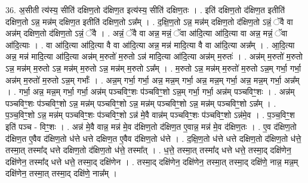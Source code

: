 \documentclass[17pt]{extarticle}
\begin{document}
36. अ॒सीती त्य॑स्य॒ सीति॑ दक्षिण॒तो द॑क्षिण॒त इत्य॑स्य॒ सीति॑ दक्षिण॒तः । . इति॑ दक्षिण॒तो द॑क्षिण॒त इतीति॑ दक्षिण॒तो ऽन्न॒ मन्न॑म् दक्षिण॒त इतीति॑ दक्षिण॒तो ऽन्न᳚म् । . द॒क्षि॒ण॒तो ऽन्न॒ मन्न॑म् दक्षिण॒तो द॑क्षिण॒तो ऽन्नं॒ ॅवै वा अन्न॑म् दक्षिण॒तो द॑क्षिण॒तो ऽन्नं॒ ॅवै । . अन्नं॒ ॅवै वा अन्न॒ मन्नं॒ ॅवा आ॑दि॒त्या आ॑दि॒त्या वा अन्न॒ मन्नं॒ ॅवा आ॑दि॒त्याः । . वा आ॑दि॒त्या आ॑दि॒त्या वै वा आ॑दि॒त्या अन्न॒ मन्न॑ मादि॒त्या वै वा आ॑दि॒त्या अन्न᳚म् । . आ॒दि॒त्या अन्न॒ मन्न॑ मादि॒त्या आ॑दि॒त्या अन्न॑म् म॒रुतो॑ म॒रुतो ऽन्न॑ मादि॒त्या आ॑दि॒त्या अन्न॑म् म॒रुतः॑ । . अन्न॑म् म॒रुतो॑ म॒रुतो ऽन्न॒ मन्न॑म् म॒रुतो ऽन्न॒ मन्न॑म् म॒रुतो ऽन्न॒ मन्न॑म् म॒रुतो ऽन्न᳚म् । . म॒रुतो ऽन्न॒ मन्न॑म् म॒रुतो॑ म॒रुतो ऽन्न॒म् गर्भा॒ गर्भा॒ अन्न॑म् म॒रुतो॑ म॒रुतो ऽन्न॒म् गर्भाः᳚ । . अन्न॒म् गर्भा॒ गर्भा॒ अन्न॒ मन्न॒म् गर्भा॒ अन्न॒ मन्न॒म् गर्भा॒ अन्न॒ मन्न॒म् गर्भा॒ अन्न᳚म् । . गर्भा॒ अन्न॒ मन्न॒म् गर्भा॒ गर्भा॒ अन्न॑म् पञ्चविꣳ॒॒शः प॑ञ्चविꣳ॒॒शो ऽन्न॒म् गर्भा॒ गर्भा॒ अन्न॑म् पञ्चविꣳ॒॒शः । . अन्न॑म् पञ्चविꣳ॒॒शः प॑ञ्चविꣳ॒॒शो ऽन्न॒ मन्न॑म् पञ्चविꣳ॒॒शो ऽन्न॒ मन्न॑म् पञ्चविꣳ॒॒शो ऽन्न॒ मन्न॑म् पञ्चविꣳ॒॒शो ऽन्न᳚म् । . प॒ञ्च॒विꣳ॒॒शो ऽन्न॒ मन्न॑म् पञ्चविꣳ॒॒शः प॑ञ्चविꣳ॒॒शो ऽन्न॑ मे॒वै वान्न॑म् पञ्चविꣳ॒॒शः प॑ञ्चविꣳ॒॒शो ऽन्न॑मे॒व । . प॒ञ्च॒विꣳ॒॒श इति॑ पञ्च - विꣳ॒॒शः । . अन्न॑ मे॒वै वान्न॒ मन्न॑ मे॒व द॑क्षिण॒तो द॑क्षिण॒त ए॒वान्न॒ मन्न॑ मे॒व द॑क्षिण॒तः । . ए॒व द॑क्षिण॒तो द॑क्षिण॒त ए॒वैव द॑क्षिण॒तो ध॑त्ते धत्ते दक्षिण॒त ए॒वैव द॑क्षिण॒तो ध॑त्ते । . द॒क्षि॒ण॒तो ध॑त्ते धत्ते दक्षिण॒तो द॑क्षिण॒तो ध॑त्ते॒ तस्मा॒त् तस्मा᳚द् धत्ते दक्षिण॒तो द॑क्षिण॒तो ध॑त्ते॒ तस्मा᳚त् । . ध॒त्ते॒ तस्मा॒त् तस्मा᳚द् धत्ते धत्ते॒ तस्मा॒द् दक्षि॑णेन॒ दक्षि॑णेन॒ तस्मा᳚द् धत्ते धत्ते॒ तस्मा॒द् दक्षि॑णेन । . तस्मा॒द् दक्षि॑णेन॒ दक्षि॑णेन॒ तस्मा॒त् तस्मा॒द् दक्षि॑णे॒ नान्न॒ मन्न॒म् दक्षि॑णेन॒ तस्मा॒त् तस्मा॒द् दक्षि॑णे॒ नान्न᳚म् । \newline
\end{document}

